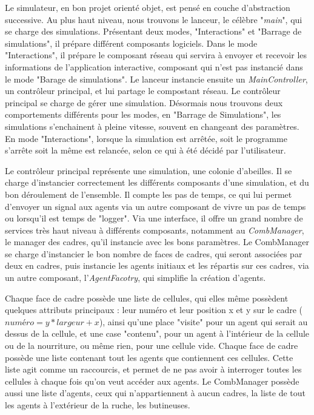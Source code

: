 			Le simulateur, en bon projet orienté objet, est pensé en couche d'abstraction successive. Au plus haut niveau, nous trouvons le lanceur, le célèbre "\textit{main}", qui se charge des simulations. Présentant deux modes, "Interactions" et "Barrage de simulations", il prépare différent composants logiciels. Dans le mode "Interactions", il prépare le composant réseau qui servira à envoyer et recevoir les informations de l'application interactive, composant qui n'est pas instancié dans le mode "Barage de simulations". Le lanceur instancie ensuite un \textit{MainController}, un contrôleur principal, et lui partage le compostant réseau. Le contrôleur principal se charge de gérer une simulation. Désormais nous trouvons deux comportements différents pour les modes, en "Barrage de Simulations", les simulations s'enchainent à pleine vitesse, souvent en changeant des paramètres. En mode "Interactions", lorsque la simulation est arrêtée, soit le programme s'arrête soit la même est relancée, selon ce qui à été décidé par l'utilisateur.
			
			Le contrôleur principal représente une simulation, une colonie d'abeilles. Il se charge d'instancier correctement les différents composants d'une simulation, et du bon déroulement de l'ensemble. Il compte les pas de temps, ce qui lui permet d'envoyer un signal aux agents via un autre composant de vivre un pas de temps ou lorsqu'il est temps de "logger". Via une interface, il offre un grand nombre de services très haut niveau à différents composants, notamment au \textit{CombManager}, le manager des cadres, qu'il instancie avec les bons paramètres. Le CombManager se charge d'instancier le bon nombre de faces de cadres, qui seront associées par deux en cadres, puis instancie les agents initiaux et les répartis sur ces cadres, via un autre composant, l'\textit{AgentFacotry}, qui simplifie la création d'agents.
			
			Chaque face de cadre possède une liste de cellules, qui elles même possèdent quelques attributs principaux : leur numéro et leur position x et y sur le cadre ($numéro = y * largeur + x$), ainsi qu'une place "visite" pour un agent qui serait au dessus de la cellule, et une case "contenu", pour un agent à l'intérieur de la cellule ou de la nourriture, ou même rien, pour une cellule vide. Chaque face de cadre possède une liste contenant tout les agents que contiennent ces cellules. Cette liste agit comme un raccourcis, et permet de ne pas avoir à interroger toutes les cellules à chaque fois qu'on veut accéder aux agents. Le CombManager possède aussi une liste d'agents, ceux qui n'appartiennent à aucun cadres, la liste de tout les agents à l'extérieur de la ruche, les butineuses.
			
